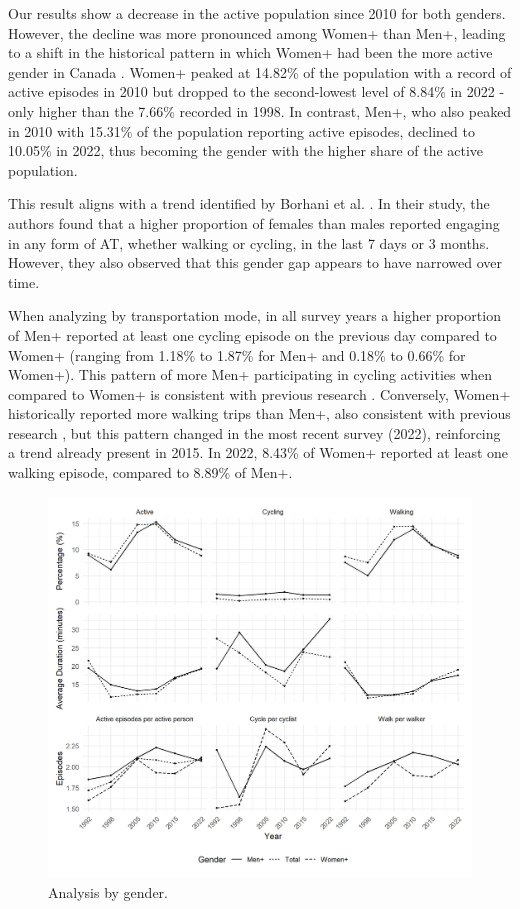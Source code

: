 \documentclass[preprint, 3p,
authoryear]{elsarticle} %
\begin{document}
Our results show a decrease in the active population since 2010 for both
genders. However, the decline was more pronounced among Women+ than
Men+, leading to a shift in the historical pattern in which Women+ had
been the more active gender in Canada \citep{bryan2009, borhani2024}.
Women+ peaked at 14.82\% of the population with a record of active
episodes in 2010 but dropped to the second-lowest level of 8.84\% in
2022 - only higher than the 7.66\% recorded in 1998. In contrast, Men+,
who also peaked in 2010 with 15.31\% of the population reporting active
episodes, declined to 10.05\% in 2022, thus becoming the gender with the
higher share of the active population.

This result aligns with a trend identified by Borhani et al.
\citeyearpar{borhani2024}. In their study, the authors found that a
higher proportion of females than males reported engaging in any form of
AT, whether walking or cycling, in the last 7 days or 3 months. However,
they also observed that this gender gap appears to have narrowed over
time.

When analyzing by transportation mode, in all survey years a higher
proportion of Men+ reported at least one cycling episode on the previous
day compared to Women+ (ranging from 1.18\% to 1.87\% for Men+ and
0.18\% to 0.66\% for Women+). This pattern of more Men+ participating in
cycling activities when compared to Women+ is consistent with previous
research \citep{heesch2012, bryan2009, borhani2024}. Conversely, Women+
historically reported more walking trips than Men+, also consistent with
previous research \citep{goel2023, pollard2017, bryan2009, borhani2024},
but this pattern changed in the most recent survey (2022), reinforcing a
trend already present in 2015. In 2022, 8.43\% of Women+ reported at
least one walking episode, compared to 8.89\% of Men+.

\begin{figure}
\includegraphics[width=1\linewidth]{figures/combined_plot_gender} \caption{Analysis by gender.}\label{fig:gender-combined-figure}
\end{figure}
\end{document}
